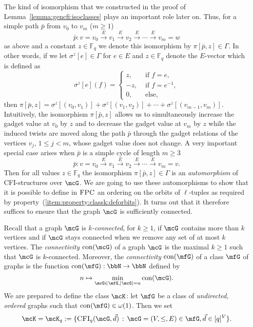 \documentclass[a4paper,UKenglish]{lipics}
\newcommand{\defeq}{:=}
\newcommand{\inseg}[1]{\ensuremath{[#1]}}
\newcommand{\card}[1]{\ensuremath{|#1|}}
\newcommand{\field}[1]{\mathbb{#1}}
\newcommand{\con}{\ensuremath{\text{con}}\xspace}
\newcommand{\N}{\ensuremath{\bbN}}
\newcommand{\logic}[1]{\ensuremath{\textsc{#1}}\xspace}
\newcommand{\FPC}{\logic{FPC}}
\newcommand{\bp}{{\bar p}}
\theoremstyle{plain}
\begin{document}
The kind of isomorphism that we constructed in the proof of 
Lemma~\ref{lemma:gencfi:isoclasses} plays an important role
later on. Thus, for a simple path $\bp$ from $v_0$ to $v_m$ ($m \geq 1$) 
\[ \bar p: v = v_0 \stackrel{E}{\longrightarrow} v_1  
\stackrel{E}{\longrightarrow} v_2 \stackrel{E}{\longrightarrow} \cdots 
\stackrel{E}{\longrightarrow} v_{m} = w\]
as above and a constant $z \in \field F_q$ we denote this isomorphism by 
$\pi[{\bp},z] \in \Gamma$. 
In other words, if  we let $\sigma^z[e] \in \Gamma$ for $e\in E$ and $z \in 
\field F_q$ denote the $E$-vector which is defined as
\[ \sigma^z[e](f) = \begin{cases}
                    z,& \text{ if } f = e,\\
                    -z,& \text{ if } f = e^{-1},\\
                    0,&\text{ else,}
                   \end{cases} \]
then $\pi[{\bp},z] = \sigma^z[{(v_0,v_1)}] + \sigma^z[{(v_1,v_2)}] + \cdots + 
\sigma^z[{(v_{m-1},v_m)}]$.
Intuitively, the isomorphism $\pi[{\bp},z]$ 
allows us to simultaneously increase the gadget value at $v_0$ by $z$ and 
to decrease the gadget value at $v_m$ by $z$ while the induced twists are 
moved along the path $\bp$ through the gadget relations of the 
vertices $v_j$, $1 \leq j < m$, whose gadget value does not change.
A very important special case arises when $\bp$ is a simple cycle of length $m 
\geq 3$
\[ \bar p: v = v_0 \stackrel{E}{\longrightarrow} v_1  
\stackrel{E}{\longrightarrow} v_2 \stackrel{E}{\longrightarrow} \cdots 
\stackrel{E}{\longrightarrow} v_{m} = v.\]
Then for all values $z \in \field F_q$ the isomorphism $\pi[\bp,z] \in 
\Gamma$ is an \emph{automorphism} of CFI-structures over $\mcG$. 
We are going to use these automorphisms to show that it is possible to define 
in 
\FPC an ordering on the orbits of $\ell$-tuples as required 
by property~(\ref{item:property:classk:deforbits}).
It turns out that it therefore suffices to ensure that the graph $\mcG$ is 
sufficiently connected. 

\medskip
Recall that a graph $\mcG$ is \emph{$k$-connected}, for $k \geq 1$, 
if $\mcG$ contains more than $k$ vertices and if $\mcG$ stays connected 
when we remove any set of at most $k$ vertices. The \emph{connectivity} 
$\con(\mcG)$ 
of a graph $\mcG$ is the maximal $k \geq 1$ such that $\mcG$ is 
$k$-connected.
Moreover, the \emph{connectivity} $\con(\mfG)$ of a class $\mfG$ of 
graphs is the function $\con(\mfG): \N \to \N$ defined by
\[ n \mapsto \min_{\mcG \in \mfG, \card \mcG = n} \con(\mcG).\]
We are prepared to define the class $\mcK$: 
let $\mfG$ be a class of \emph{undirected, ordered} graphs
such that $\con(\mfG) \in \omega(1)$. 
Then we set
\[ \mcK = \mcK_q \defeq \{ \CFI(\mcG,\vec d) \, : \, \mcG=(V, \leq, E) \in 
\mfG, \vec d \in \inseg q^V\}.\]
\end{document}
